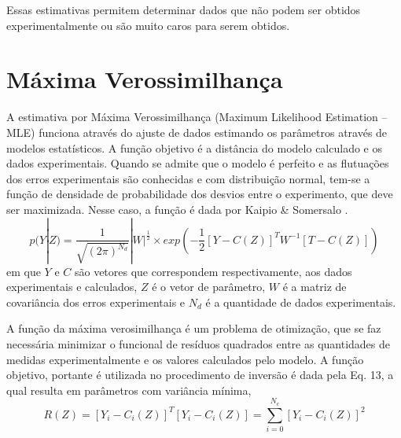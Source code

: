 \documentclass[por]{Template_SBEF}
\begin{document}
Essas estimativas permitem determinar dados que não podem ser obtidos experimentalmente ou são muito caros para serem obtidos.
\section{Máxima Verossimilhança}
A estimativa por Máxima Verossimilhança (Maximum Likelihood Estimation – MLE) funciona através do ajuste de dados estimando os parâmetros através de modelos estatísticos. A função objetivo é a distância do modelo calculado e os dados experimentais. Quando se admite que o modelo é perfeito e as flutuações dos erros experimentais são conhecidas e com distribuição normal, tem-se a função de densidade de probabilidade dos desvios entre o experimento, que deve ser maximizada. Nesse caso, a função é dada por Kaipio \& Somersalo \cite{kapio_book}.
\begin{equation}
p(Y|Z)= \frac{1}{\sqrt{(2\pi)^{N_d}}}|W|^\frac{1}{2}\times exp(-\frac{1}{2}[Y-C(Z)]^T W^{-1}[T-C(Z)])
\end{equation}
em que $Y$ e $C$ são vetores que correspondem respectivamente, aos dados experimentais e calculados, $Z$ é o vetor de parâmetro, $W$ é a matriz de covariância dos erros experimentais e $N_d$ é a quantidade de dados experimentais.

A função da máxima verosimilhança é um problema de otimização, que se faz necessária minimizar o funcional de resíduos quadrados entre as quantidades de medidas experimentalmente e os valores calculados pelo modelo. A função objetivo, portante é utilizada no procedimento de inversão é dada pela Eq. 13, a qual resulta em parâmetros com variância mínima,
\begin{equation}
R(Z) = [Y_i - C_i(Z)]^T [Y_i - C_i (Z)] = \sum_{i=0}^{N_c}[Y_i - C_i(Z)]^2
\end{equation}
\end{document}

